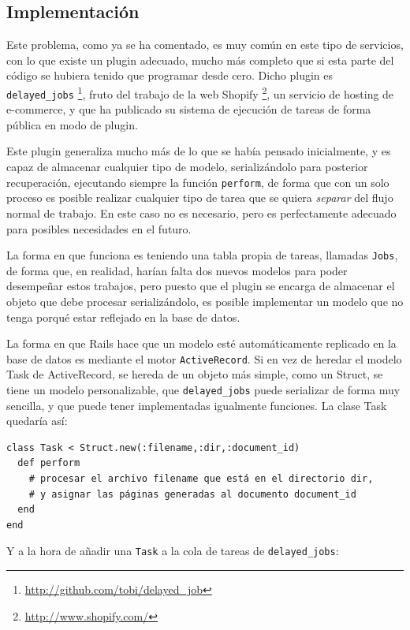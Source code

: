 
\subsection{Implementación} %
\label{sub:implementación}

Este problema, como ya se ha comentado, es muy común en este tipo de servicios, con lo que existe un plugin adecuado, mucho más completo que si esta parte del código se hubiera tenido que programar desde cero. Dicho plugin es \texttt{delayed\_jobs} \footnote{\url{http://github.com/tobi/delayed\_job}}, fruto del trabajo de la web Shopify \footnote{\url{http://www.shopify.com/}}, un servicio de hosting de e-commerce, y que ha publicado su sistema de ejecución de tareas de forma pública en modo de plugin.

Este plugin generaliza mucho más de lo que se había pensado inicialmente, y es capaz de almacenar cualquier tipo de modelo, serializándolo para posterior recuperación, ejecutando siempre la función \texttt{perform}, de forma que con un solo proceso es posible realizar cualquier tipo de tarea que se quiera \emph{separar} del flujo normal de trabajo. En este caso no es necesario, pero es perfectamente adecuado para posibles necesidades en el futuro.

La forma en que funciona es teniendo una tabla propia de tareas, llamadas \texttt{Jobs}, de forma que, en realidad, harían falta dos nuevos modelos para poder desempeñar estos trabajos, pero puesto que el plugin se encarga de almacenar el objeto que debe procesar serializándolo, es posible implementar un modelo que no tenga porqué estar reflejado en la base de datos.

La forma en que Rails hace que un modelo esté automáticamente replicado en la base de datos es mediante el motor \texttt{ActiveRecord}. Si en vez de heredar el modelo Task de ActiveRecord, se hereda de un objeto más simple, como un Struct, se tiene un modelo personalizable, que \texttt{delayed\_jobs} puede serializar de forma muy sencilla, y que puede tener implementadas igualmente funciones. La clase Task quedaría así:
\begin{verbatim}
class Task < Struct.new(:filename,:dir,:document_id)
  def perform
    # procesar el archivo filename que está en el directorio dir,
    # y asignar las páginas generadas al documento document_id
  end    
end
\end{verbatim}

Y a la hora de añadir una \texttt{Task} a la cola de tareas de \texttt{delayed\_jobs}:

